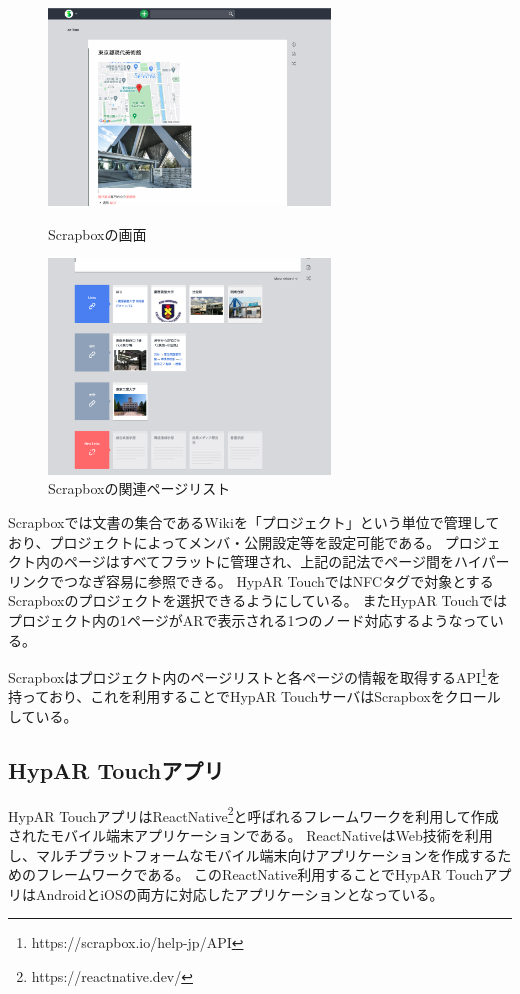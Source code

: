 \begin{figure}[H]
  \begin{minipage}{0.5\hsize}
    \centering
    \includegraphics[width=75mm]{images/scrapbox_screen.png}
    \caption{Scrapboxの画面} \label{fig:scrapbox}
  \end{minipage}
  \begin{minipage}{0.5\hsize}
    \centering
    \includegraphics[width=75mm]{images/scrapbox_related_screen.png}
    \caption{Scrapboxの関連ページリスト} \label{fig:scrapbox_related}
  \end{minipage}
\end{figure}

Scrapboxでは文書の集合であるWikiを「プロジェクト」という単位で管理しており、プロジェクトによってメンバ・公開設定等を設定可能である。
プロジェクト内のページはすべてフラットに管理され、上記の記法でページ間をハイパーリンクでつなぎ容易に参照できる。
HypAR TouchではNFCタグで対象とするScrapboxのプロジェクトを選択できるようにしている。
またHypAR Touchではプロジェクト内の1ページがARで表示される1つのノード対応するようなっている。

Scrapboxはプロジェクト内のページリストと各ページの情報を取得するAPI\footnote{\textsf{https://scrapbox.io/help-jp/API}}を持っており、これを利用することでHypAR TouchサーバはScrapboxをクロールしている。


\subsection{HypAR Touchアプリ}
HypAR TouchアプリはReactNative\footnote{\textsf{https://reactnative.dev/}}と呼ばれるフレームワークを利用して作成されたモバイル端末アプリケーションである。
ReactNativeはWeb技術を利用し、マルチプラットフォームなモバイル端末向けアプリケーションを作成するためのフレームワークである。
このReactNative利用することでHypAR TouchアプリはAndroidとiOSの両方に対応したアプリケーションとなっている。


